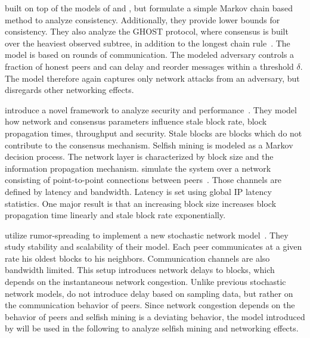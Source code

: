 \citeauthor{kiffer2018better} built on top of the models of \citeauthor{garay2015bitcoin} and \citeauthor{pass2017analysis}, but formulate a simple Markov chain based method to analyze consistency. Additionally, they provide lower bounds for consistency. They also analyze the GHOST protocol, where consensus is built over the heaviest observed subtree, in addition to the longest chain rule~\cite{kiffer2018better}. The model is based on rounds of communication. The modeled adversary controls a fraction of honest peers and  can delay and reorder messages within a threshold $\delta$. The model therefore again captures only network attacks from an adversary, but disregards other networking effects.

\citeauthor{gervais2016security} introduce a novel framework to analyze security and performance~\cite{gervais2016security}. They model how network and consensus parameters influence stale block rate, block propagation times, throughput and security. Stale blocks are blocks which do not contribute to the consensus mechanism. Selfish mining is modeled as a Markov decision process. The network layer is characterized by block size and the information propagation mechanism. \citeauthor{gervais2016security} simulate the system over a network consisting of point-to-point connections between peers~\cite{gervais2016security}. Those channels are defined by latency and bandwidth. Latency is set using global IP latency statistics. One major result is that an increasing block size increases block propagation time linearly and stale block rate exponentially. 

\citeauthor{gopalan} utilize rumor-spreading to implement a new stochastic network model~\cite{gopalan}. They study stability and scalability of their model. Each peer communicates at a given rate his oldest blocks to his neighbors. Communication channels are also bandwidth limited. This setup introduces network delays to blocks, which depends on the instantaneous network congestion.
Unlike previous stochastic network models, \citeauthor{gopalan} do not introduce delay based on sampling data, but rather on the communication behavior of peers. Since network congestion depends on the behavior of peers and selfish mining is a deviating behavior, the model introduced by \citeauthor{gopalan} will be used in the following to analyze selfish mining and networking effects.

